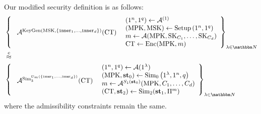 Our modified security definition is as follows:
\begin{equation}
\label{eq:FEsec}
\begin{aligned}
	&\left\{
		\begin{array}{l}
		\vcenter{\hbox{
			$\advers^{\text{KeyGen}(\MSK, \{\inner_1, \dots, \inner_d\})}(\mathbf{\FECT})$
			}}
		\end{array}
		\begin{array}{l}
		\left(1^n, 1^q\right) \leftarrow \advers^{(1)} \\
		\left(\MPK, \MSK\right) \leftarrow \text{Setup}\left(1^n, 1^q\right) \\
		m \leftarrow \advers(\MPK, \SK_{C_1}, \dots, \SK_{C_d}) \\
		\FECT \leftarrow \text{Enc}(\MPK, m)
		\end{array}
	\right\}_{\lambda \in \N}\\
&\compInd \\
	&\left\{
		\begin{array}{l}
		\vcenter{\hbox{
			$\advers^{\Sim_3^{U_m(\{\inner_1, \dots, \inner_d\})}}(\FECT)$
		}}
		\end{array}
		\begin{array}{l}
		\left(1^n, 1^q\right) \leftarrow \advers{(1^\lambda)} \\
		\left(\MPK, \mathbf{st}_0\right) \leftarrow \Sim_0\left(1^\lambda, 1^n, q\right) \\
		m \leftarrow \advers^{S_1(\mathbf{st}_0)}(\MPK, C_1, \dots, C_d) \\
		\left(\FECT, \mathbf{st}_2\right) \leftarrow \Sim_2(\mathbf{st}_1, \Pi^m)
		\end{array}
	\right\}_{\lambda \in \N}
\end{aligned}
\end{equation}
where the admissibility constraints remain the same.


